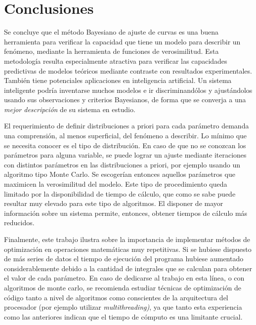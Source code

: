 \documentclass{article}
\begin{document}
\section{Conclusiones}
Se concluye que el método Bayesiano de ajuste de curvas es una buena herramienta para verificar la capacidad que tiene un modelo para describir un fenómeno, mediante la herramienta de funciones de verosimilitud. Esta metodología resulta especialmente atractiva para verificar las capacidades predictivas de modelos teóricos mediante contraste con resultados experimentales. También tiene potenciales aplicaciones en inteligencia artificial. Un sistema inteligente podría inventarse muchos modelos e ir discriminandólos y ajustándolos usando sus observaciones y criterios Bayesianos, de forma que se converja a una \emph{mejor descripción} de su sistema en estudio.

El requerimiento de definir distribuciones a priori para cada parámetro demanda una comprensión, al menos superficial, del fenómeno a describir. Lo mínimo que se necesita conocer es el tipo de distribución. En caso de que no se conozcan los parámetros para alguna variable, se puede lograr un ajuste mediante iteraciones con distintos parámetros en las distribuciones a priori, por ejemplo usando un algoritmo tipo Monte Carlo. Se escogerían entonces aquellos parámetros que maximicen la verosimilitud del modelo. Este tipo de procedimiento queda limitado por la disponibilidad de tiempo de cálculo, que como se sabe puede resultar muy elevado para este tipo de algoritmos. El disponer de mayor información sobre un sistema permite, entonces, obtener tiempos de cálculo más reducidos.

Finalmente, este trabajo ilustra sobre la importancia de implementar métodos de optimización en operaciones matemáticas muy repetitivas. Si se hubiese dispuesto de más series de datos el tiempo de ejecución del programa hubiese aumentado considerablemente debido a la cantidad de integrales que se calculan para obtener el valor de cada parámetro. En caso de dedicarse al trabajo en esta línea, o con algoritmos de monte carlo, se recomienda estudiar técnicas de optimización de código tanto a nivel de algoritmos como conscientes de la arquitectura del procesador (por ejemplo utilizar \emph{multithreading)}, ya que tanto esta experiencia como las anteriores indican que el tiempo de cómputo es una limitante crucial.
\end{document}
